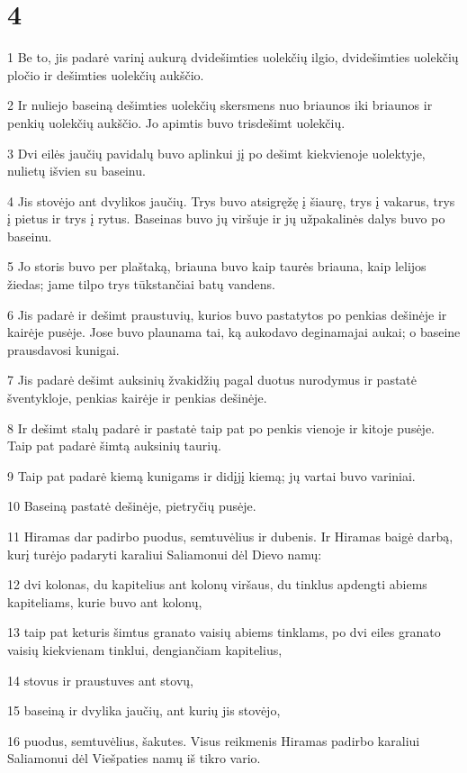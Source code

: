 \chapter{4}


\par 1 Be to, jis padarė varinį aukurą dvidešimties uolekčių ilgio, dvidešimties uolekčių pločio ir dešimties uolekčių aukščio. 
\par 2 Ir nuliejo baseiną dešimties uolekčių skersmens nuo briaunos iki briaunos ir penkių uolekčių aukščio. Jo apimtis buvo trisdešimt uolekčių. 
\par 3 Dvi eilės jaučių pavidalų buvo aplinkui jį po dešimt kiekvienoje uolektyje, nulietų išvien su baseinu. 
\par 4 Jis stovėjo ant dvylikos jaučių. Trys buvo atsigręžę į šiaurę, trys į vakarus, trys į pietus ir trys į rytus. Baseinas buvo jų viršuje ir jų užpakalinės dalys buvo po baseinu. 
\par 5 Jo storis buvo per plaštaką, briauna buvo kaip taurės briauna, kaip lelijos žiedas; jame tilpo trys tūkstančiai batų vandens. 
\par 6 Jis padarė ir dešimt praustuvių, kurios buvo pastatytos po penkias dešinėje ir kairėje pusėje. Jose buvo plaunama tai, ką aukodavo deginamajai aukai; o baseine prausdavosi kunigai. 
\par 7 Jis padarė dešimt auksinių žvakidžių pagal duotus nurodymus ir pastatė šventykloje, penkias kairėje ir penkias dešinėje. 
\par 8 Ir dešimt stalų padarė ir pastatė taip pat po penkis vienoje ir kitoje pusėje. Taip pat padarė šimtą auksinių taurių. 
\par 9 Taip pat padarė kiemą kunigams ir didįjį kiemą; jų vartai buvo variniai. 
\par 10 Baseiną pastatė dešinėje, pietryčių pusėje. 
\par 11 Hiramas dar padirbo puodus, semtuvėlius ir dubenis. Ir Hiramas baigė darbą, kurį turėjo padaryti karaliui Saliamonui dėl Dievo namų: 
\par 12 dvi kolonas, du kapitelius ant kolonų viršaus, du tinklus apdengti abiems kapiteliams, kurie buvo ant kolonų, 
\par 13 taip pat keturis šimtus granato vaisių abiems tinklams, po dvi eiles granato vaisių kiekvienam tinklui, dengiančiam kapitelius, 
\par 14 stovus ir praustuves ant stovų, 
\par 15 baseiną ir dvylika jaučių, ant kurių jis stovėjo, 
\par 16 puodus, semtuvėlius, šakutes. Visus reikmenis Hiramas padirbo karaliui Saliamonui dėl Viešpaties namų iš tikro vario. 
